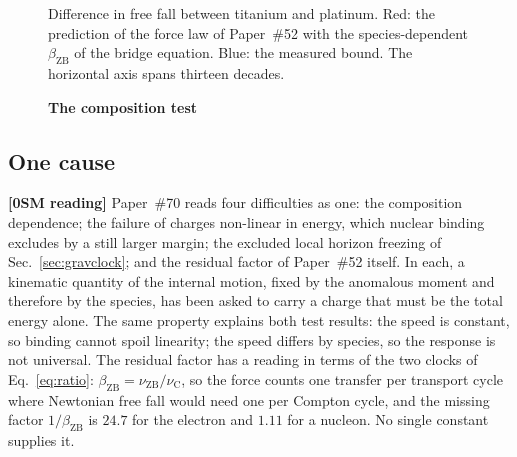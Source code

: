 \documentclass[%
 reprint, amsmath,amssymb, aps, prb, ]{revtex4-2}
\numberwithin{equation}{section}
\newcommand{\betaZB}{\beta_{\text{ZB}}}
\newcommand{\nuZB}{\nu_{\text{ZB}}}
\newcommand{\nuC}{\nu_{\text{C}}}
\begin{document}
\begin{figure}[t!]
\centering
{}
\caption{\textbf{The composition test}}
\label{fig:tests}
\vspace{0.4em}
\begin{minipage}{0.95\columnwidth}
\justifying\small
Difference in free fall between titanium and platinum. Red: the prediction of the force law of Paper~\#52 with the species-dependent $\betaZB$ of the bridge equation. Blue: the measured bound. The horizontal axis spans thirteen decades.
\end{minipage}
\end{figure}

\subsection{One cause}

\textbf{[0SM reading]} Paper~\#70 reads four difficulties as one: the composition dependence; the failure of charges non-linear in energy, which nuclear binding excludes by a still larger margin; the excluded local horizon freezing of Sec.~\ref{sec:gravclock}; and the residual factor of Paper~\#52 itself. In each, a kinematic quantity of the internal motion, fixed by the anomalous moment and therefore by the species, has been asked to carry a charge that must be the total energy alone. The same property explains both test results: the speed is constant, so binding cannot spoil linearity; the speed differs by species, so the response is not universal. The residual factor has a reading in terms of the two clocks of Eq.~\eqref{eq:ratio}: $\betaZB = \nuZB/\nuC$, so the force counts one transfer per transport cycle where Newtonian free fall would need one per Compton cycle, and the missing factor $1/\betaZB$ is $24.7$ for the electron and $1.11$ for a nucleon. No single constant supplies it.
\end{document}
